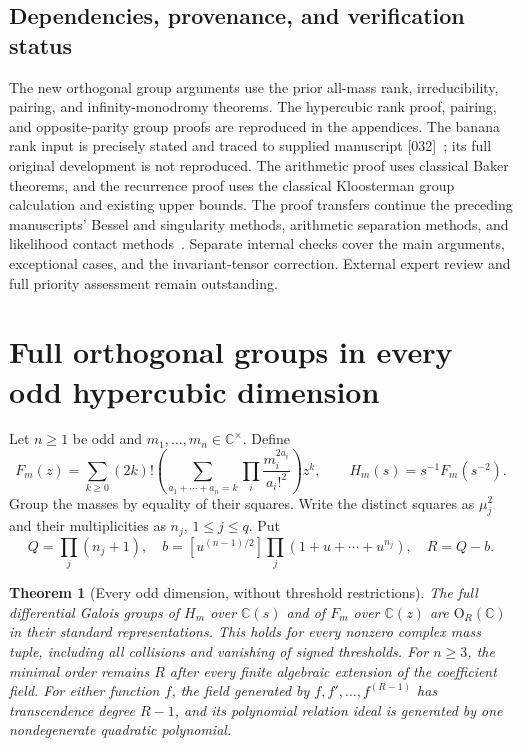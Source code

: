 \documentclass[11pt,a4paper]{article}
\newtheorem{theorem}{Theorem}[section]
\theoremstyle{definition}
\theoremstyle{remark}
\numberwithin{equation}{section}
\begin{document}
\subsection{Dependencies, provenance, and verification status}

The new orthogonal group arguments use the prior all-mass rank,
irreducibility, pairing, and infinity-monodromy theorems. The
hypercubic rank proof, pairing, and opposite-parity group proofs are
reproduced in the appendices. The banana rank input is precisely
stated and traced to supplied manuscript [032]~\cite{p5:Keio032}; its
full original development is not reproduced. The arithmetic proof
uses classical Baker theorems, and the recurrence proof uses the
classical Kloosterman group calculation and existing upper bounds.
The proof transfers continue the preceding manuscripts' Bessel and
singularity methods, arithmetic separation methods, and likelihood
contact methods~\cite{p7:KeioGlobalRank,p7:KeioGlobalGroups}.
Separate internal checks cover the main arguments, exceptional cases,
and the invariant-tensor correction. External expert review and full
priority assessment remain outstanding.



\clearpage

\section{Full orthogonal groups in every odd hypercubic dimension}
\label{p7:gn:sec}

Let $n\ge1$ be odd and $m_1,\ldots,m_n\in\mathbb C^\times$.
Define
\[
 F_m(z)=\sum_{k\ge0}(2k)!\left(\sum_{a_1+\cdots+a_n=k}
       \prod_i\frac{m_i^{2a_i}}{a_i!^2}\right)z^k,
 \qquad H_m(s)=s^{-1}F_m(s^{-2}).
\]
Group the masses by equality of their squares. Write the distinct
squares as $\mu_j^2$ and their multiplicities as $n_j$, $1\le j\le q$.
Put
\[
 Q=\prod_j(n_j+1),\quad
 b=[u^{(n-1)/2}]\prod_j(1+u+\cdots+u^{n_j}),\quad R=Q-b.
\]

\begin{theorem}[Every odd dimension, without threshold restrictions]
\label{p7:gn:main}
The full differential Galois groups of $H_m$ over $\mathbb C(s)$
and of $F_m$ over $\mathbb C(z)$ are $\mathrm O_R(\mathbb C)$
in their standard representations. This holds for every nonzero
complex mass tuple, including all collisions and vanishing of
signed thresholds.
For $n\ge3$, the minimal order remains $R$ after every finite
algebraic extension of the coefficient field. For either function
$f$, the field generated by $f,f',\ldots,f^{(R-1)}$ has
transcendence degree $R-1$, and its polynomial relation ideal is
generated by one nondegenerate quadratic polynomial.
\end{theorem}
\end{document}
